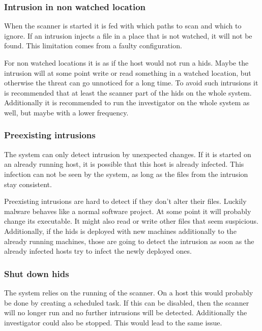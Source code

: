 \documentclass[
	a4paper,					%
	10pt,							%
	twoside,					%
	openright,				%
	notitlepage,			%
	parskip=half,			%
]{scrreprt}					%
\begin{document}
\subsubsection{Intrusion in non watched location}
\label{sec:limitation:nonWatched}
When the scanner is started it is fed with which paths to scan and which to ignore. If an intrusion injects a file in a place that is not watched, it will not be found. This limitation comes from a faulty configuration.

For non watched locations it is as if the host would not run a \gls{hids}. Maybe the intrusion will at some point write or read something in a watched location, but otherwise the threat can go unnoticed for a long time. To avoid such intrusions it is recommended that at least the scanner part of the \gls{hids} on the whole system. Additionally it is recommended to run the investigator on the whole system as well, but maybe with a lower frequency.

\subsubsection{Preexisting intrusions}
\label{sec:limitation:preexisting}
The system can only detect intrusion by unexpected changes. If it is started on an already running host, it is possible that this host is already infected. This infection can not be seen by the system, as long as the files from the intrusion stay consistent. 

Preexisting intrusions are hard to detect if they don't alter their files. Luckily malware behaves like a normal software project. At some point it will probably change its executable. It might also read or write other files that seem suspicious. Additionally, if the \gls{hids} is deployed with new machines additionally to the already running machines, those are going to detect the intrusion as soon as the already infected hosts try to infect the newly deployed ones.

\subsubsection{Shut down \gls{hids}}
\label{sec:limitation:noscan}
The system relies on the running of the scanner. On a host this would probably be done by creating a scheduled task. If this can be disabled, then the scanner will no longer run and no further intrusions will be detected. Additionally the investigator could also be stopped. This would lead to the same issue.
\end{document}
